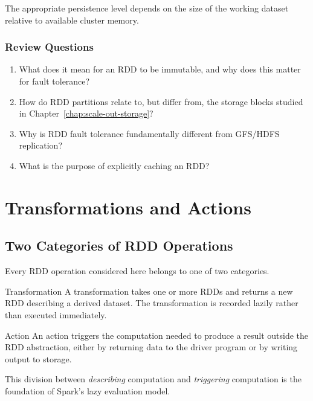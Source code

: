 \documentclass[11pt,a4paper,oneside]{book}
\begin{document}
The appropriate persistence level depends on the size of the working dataset relative to available cluster memory.

\subsubsection*{Review Questions}
\begin{enumerate}
    \item What does it mean for an RDD to be immutable, and why does this matter for fault tolerance?
    \item How do RDD partitions relate to, but differ from, the storage blocks studied in Chapter~\ref{chap:scale-out-storage}?
    \item Why is RDD fault tolerance fundamentally different from GFS/HDFS replication?
    \item What is the purpose of explicitly caching an RDD?
\end{enumerate}

\section{Transformations and Actions}
\label{sec:spark-transformations-actions}

\subsection{Two Categories of RDD Operations}

Every RDD operation considered here belongs to one of two categories.

\begin{definitionbox}{Transformation}
A transformation takes one or more RDDs and returns a new RDD describing a derived dataset. The transformation is recorded lazily rather than executed immediately.
\end{definitionbox}

\begin{definitionbox}{Action}
An action triggers the computation needed to produce a result outside the RDD abstraction, either by returning data to the driver program or by writing output to storage.
\end{definitionbox}

This division between \emph{describing} computation and \emph{triggering} computation is the foundation of Spark's lazy evaluation model.
\end{document}
